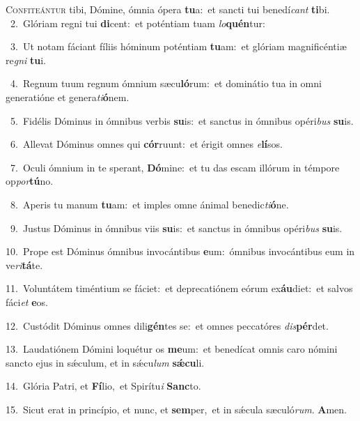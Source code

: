 \lettrine{\initial\textcolor{\initialcolor}{C}}{onfiteántur} tibi, Dómine, ómnia ópera \textbf{tu}\-a:~\star et sancti tui benedí\textit{cant} \textbf{ti}\-bi.\\
{\numbfont\textcolor{\numbcolor}{~2.}}~Glóriam regni tui \textbf{di}\-cent:~\star et poténtiam tuam \textit{lo}\-\textbf{quén}tur:\par
{\numbfont\textcolor{\numbcolor}{~3.}}~Ut notam fáciant fíliis hóminum poténtiam \textbf{tu}\-am:~\star et glóriam magnificéntiæ re\textit{gni} \textbf{tu}\-i.\par
{\numbfont\textcolor{\numbcolor}{~4.}}~Regnum tuum regnum ómnium sæcu\-\textbf{ló}\-rum:~\star et dominátio tua in omni generatióne et genera\-\textit{ti}\-\textbf{ó}nem.\par
{\numbfont\textcolor{\numbcolor}{~5.}}~Fidélis Dóminus in ómnibus verbis \textbf{su}\-is:~\star et sanctus in ómnibus opéri\textit{bus} \textbf{su}\-is.\par
{\numbfont\textcolor{\numbcolor}{~6.}}~Allevat Dóminus omnes qui \textbf{cór}\-ruunt:~\star et érigit omnes \textit{e}\-\textbf{lí}sos.\par
{\numbfont\textcolor{\numbcolor}{~7.}}~Oculi ómnium in te sperant, \textbf{Dó}\-mine:~\star et tu das escam illórum in témpore op\-\textit{por}\-\textbf{tú}no.\par
{\numbfont\textcolor{\numbcolor}{~8.}}~Aperis tu manum \textbf{tu}\-am:~\star et imples omne ánimal benedic\-\textit{ti}\-\textbf{ó}ne.\par
{\numbfont\textcolor{\numbcolor}{~9.}}~Justus Dóminus in ómnibus viis \textbf{su}\-is:~\star et sanctus in ómnibus opéri\textit{bus} \textbf{su}\-is.\par
{\numbfont\textcolor{\numbcolor}{10.}}~Prope est Dóminus ómnibus invocántibus \textbf{e}\-um:~\star ómnibus invocántibus eum in ve\-\textit{ri}\-\textbf{tá}te.\par
{\numbfont\textcolor{\numbcolor}{11.}}~Voluntátem timéntium se fáciet:~\dagger et deprecatiónem eórum ex\-\textbf{áu}\-diet:~\star et salvos fáci\textit{et} \textbf{e}\-os.\par
{\numbfont\textcolor{\numbcolor}{12.}}~Custódit Dóminus omnes dili\-\textbf{gén}\-tes se:~\star et omnes peccatóres \textit{dis}\-\textbf{pér}det.\par
{\numbfont\textcolor{\numbcolor}{13.}}~Laudatiónem Dómini loquétur os \textbf{me}\-um:~\star et benedícat omnis caro nómini sancto ejus in sǽculum, et in sǽcu\textit{lum} \textbf{sǽ}\-\textbf{cu}li.\par
{\numbfont\textcolor{\numbcolor}{14.}}~Glória Patri, et \textbf{Fí}\-lio,~\star et Spirítu\textit{i} \textbf{Sanc}\-to.\par
{\numbfont\textcolor{\numbcolor}{15.}}~Sicut erat in princípio, et nunc, et \textbf{sem}\-per,~\star et in sǽcula sæculó\-\textit{rum}\-. \textbf{A}\-men.\par
